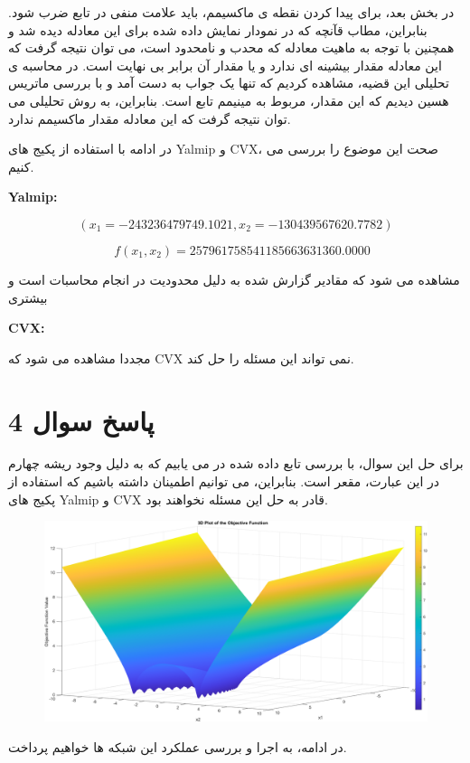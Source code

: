 در بخش بعد، برای پیدا کردن نقطه ی ماکسیمم، باید علامت منفی در تابع ضرب شود. بنابراین، مطاب قآنچه که در نمودار نمایش داده شده برای این معادله دیده شد و همچنین با توجه به ماهیت معادله که محدب و نامحدود است، می توان نتیجه گرفت که این معادله مقدار بیشینه ای ندارد و یا مقدار آن برابر بی نهایت است. 
در محاسبه ی تحلیلی این قضیه، مشاهده کردیم که تنها یک جواب به دست آمد و با بررسی ماتریس هسین دیدیم که این مقدار، مربوط به مینیمم تابع است. بنابراین، به روش تحلیلی می توان نتیجه گرفت که این معادله مقدار ماکسیمم ندارد.

در ادامه با استفاده از پکیج های Yalmip و CVX، صحت این موضوع را بررسی می کنیم.

\textbf{Yalmip:}


\[
(x_1 = -243236479749.1021, x_2 = -130439567620.7782) 
\]

\[
\quad f(x_1, x_2) = 257961758541185663631360.0000
\]

مشاهده می شود که مقادیر گزارش شده به دلیل محدودیت در انجام محاسبات است و بیشتری

\textbf{CVX:}


مجددا مشاهده می شود که CVX نمی تواند این مسئله را حل کند.

\section{پاسخ سوال 4}
 
 برای حل این سوال، با بررسی تابع داده شده در می یابیم که به دلیل وجود ریشه چهارم در این عبارت، مقعر است. بنابراین، می توانیم اطمینان داشته باشیم که استفاده از پکیج های Yalmip و CVX قادر به حل این مسئله نخواهند بود.
 \begin{figure}[H]
 	\centering
 	\includegraphics[width=1\linewidth]{../img/Q4}
 	\caption{}
 	\label{fig:q4}
 \end{figure}
  در ادامه، به اجرا و بررسی عملکرد این شبکه ها خواهیم پرداخت.
 
